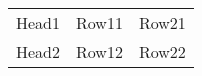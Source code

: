 \documentclass{article}
\begin{document}
\begin{table}{}
\centering
\begin{tabular}{lll}
\hline
 Head1 & Row11 & Row21 \\
 Head2 & Row12 & Row22 \\
\hline
\end{tabular}
\end{table}
\end{document}
